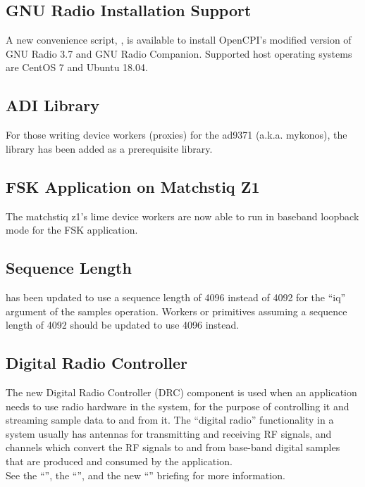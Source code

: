 \subsection{GNU Radio Installation Support}
\label{sec:21_gnuradio_install}
A new convenience script, , is available to install OpenCPI's modified version of GNU Radio 3.7 and GNU Radio Companion.  Supported host operating systems are CentOS 7 and Ubuntu 18.04.

\subsection{ADI  Library}
\label{sec:21_mykonos_library}
For those writing device workers (proxies) for the ad9371 (a.k.a. mykonos), the  library has been added as a prerequisite library.

\subsection{FSK Application on Matchstiq Z1}
\label{sec:21_fsk_application}
The matchstiq z1's lime device workers are now able to run in baseband loopback mode for the FSK application.

\subsection{ Sequence Length}
\label{sec:21_seq_length}
 has been updated to use a sequence length of 4096 instead of 4092 for the ``iq'' argument of the samples operation.  Workers or primitives assuming a sequence length of 4092 should be updated to use 4096 instead.

\subsection{Digital Radio Controller}
\label{sec:21_drc}
The new Digital Radio Controller (DRC) component is used when an application needs to use radio hardware in the system, for the purpose of controlling it and streaming sample data to and from it.  The “digital radio” functionality in a system usually has antennas for transmitting and receiving RF signals, and channels which convert the RF signals to and from base-band digital samples that are produced and consumed by the application.\\

See the ``'', the ``'', and the new ``'' briefing for more information.


